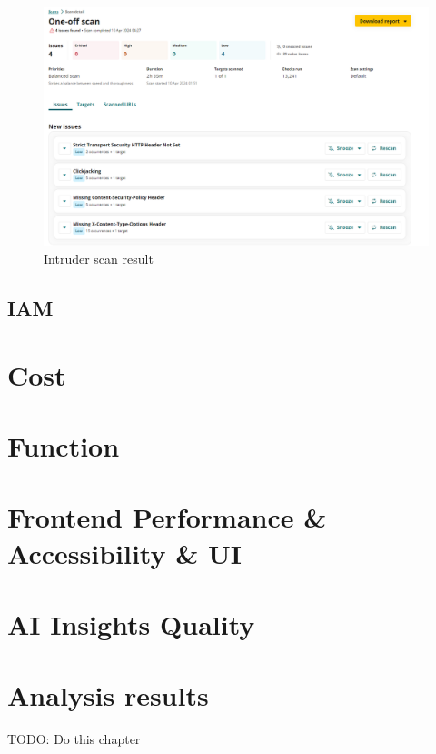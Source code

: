 \begin{figure}
    
    \centering
    \includegraphics[width=1\textwidth,keepaspectratio]{../images/IntruderResults.png}
    \caption{Intruder scan result}
    \label{fig:intruder}
    
\end{figure}
\subsection{IAM}
\section{Cost}
\section{Function}
\section{Frontend Performance \& Accessibility \& UI}
\section{AI Insights Quality}
\section{Analysis results}
TODO: Do this chapter
